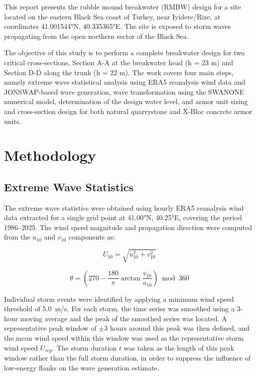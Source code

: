 \documentclass[a4paper, 11pt]{article}
\begin{document}
\hspace*{0.5cm}This report presents the rubble mound breakwater (RMBW) design for a site located on the eastern Black Sea coast of Turkey, near Iyidere/Rize, at coordinates 41.001544°N, 40.335365°E. The site is exposed to storm waves propagating from the open northern sector of the Black Sea.

The objective of this study is to perform a complete breakwater design for two critical cross-sections, Section A-A at the breakwater head (h = 23 m) and Section D-D along the trunk (h = 22 m). The work covers four main steps, namely extreme wave statistical analysis using ERA5 reanalysis wind data and JONSWAP-based wave generation, wave transformation using the SWANONE numerical model, determination of the design water level, and armor unit sizing and cross-section design for both natural quarrystone and X-Bloc concrete armor units. 

\section{Methodology}
\subsection{Extreme Wave Statistics}
\hspace{0.5cm} The extreme wave statistics were obtained using hourly ERA5 
reanalysis wind data extracted for a single grid point at 41.00°N, 40.25°E, 
covering the period 1986--2025. The wind speed magnitude and propagation 
direction were computed from the $u_{10}$ and $v_{10}$ components as:

\begin{equation}
    U_{10} = \sqrt{u_{10}^2 + v_{10}^2}
\end{equation}

\begin{equation}
    \theta = \left(270 - \frac{180}{\pi}\arctan\frac{v_{10}}{u_{10}}
    \right) \bmod 360
\end{equation}

Individual storm events were identified by applying a minimum wind speed 
threshold of 5.0~m/s. For each storm, the time series was smoothed using 
a 3-hour moving average and the peak of the smoothed series was located. 
A representative peak window of $\pm$3 hours around this peak was then 
defined, and the mean wind speed within this window was used as the 
representative storm wind speed $U_{rep}$. The storm duration $t$ was 
taken as the length of this peak window rather than the full storm 
duration, in order to suppress the influence of low-energy flanks on the 
wave generation estimate.
\end{document}
